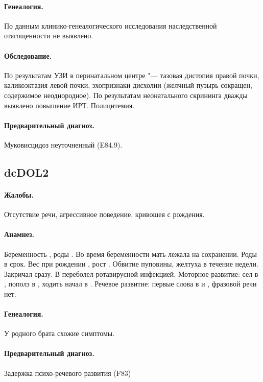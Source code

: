 \documentclass[a4paper,14pt]{extarticle}
\newcommand{\gramm}{г}
\newcommand{\cm}{см}
\newcommand{\months}{мес.}
\begin{document}
\paragraph{Генеалогия.}
По данным клинико-генеалогического исследования наследственной отягощенности не выявлено.

\paragraph{Обследование.}
По результатам УЗИ в перинатальном центре "--- тазовая дистопия правой почки, каликоэктазия левой почки, эхопризнаки дисхолии (желчный пузырь сокращен, содержимое неоднородное).
По результатам неонатального скрининга дважды выявлено повышение ИРТ.
Полицитемия.

\paragraph{Предварительный диагноз.}
Муковисцидоз неуточненный (E84.9).

\subsection*{dcDOL2}

\paragraph{Жалобы.}
Отсутствие речи, агрессивное поведение, кривошея с рождения.

\paragraph{Анамнез.}
Беременность , роды .
Во время беременности мать лежала на сохранении.
Роды в срок.
Вес при рождении \numprint[\gramm]{3710}, рост \numprint[\cm]{54}.
Обвитие пуповины, желтуха в течение недели.
Закричал сразу.
В \numprint[\months]{5} переболел ротавирусной инфекцией.
Моторное развитие: сел в \numprint[\months]{9}, пополз в \numprint[\months]{8}, ходить начал в \numprint[\months]{10}.
Речевое развитие: первые слова в  и \numprint[\months]{3}, фразовой речи нет.

\paragraph{Генеалогия.}
У родного брата схожие симптомы.

\paragraph{Предварительный диагноз.}
Задержка психо-речевого развития (F83)
\end{document}
